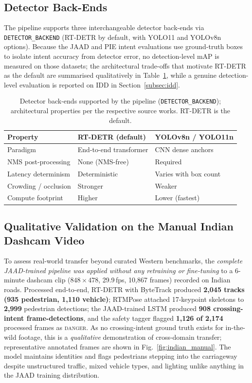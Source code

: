 \documentclass[conference]{IEEEtran}
\begin{document}
\subsection{Detector Back-Ends}

The pipeline supports three interchangeable detector back-ends via
\texttt{DETECTOR\_BACKEND} (RT-DETR by default, with YOLO11 and YOLOv8n options).
Because the JAAD and PIE intent evaluations use ground-truth boxes to isolate intent
accuracy from detector error, no detection-level mAP is measured on those datasets; the
architectural trade-offs that motivate RT-DETR as the default are summarised
qualitatively in Table~\ref{tab:detector_qual}, while a genuine detection-level
evaluation is reported on IDD in Section~\ref{subsec:idd}.

\begin{table}[h]
\centering
\small
\setlength{\tabcolsep}{4pt}
\renewcommand{\arraystretch}{1.15}
\caption{Detector back-ends supported by the pipeline
(\texttt{DETECTOR\_BACKEND}); architectural properties per the respective source
works. RT-DETR is the default.}
\label{tab:detector_qual}
\begin{tabular}{|p{2.0cm}|p{2.6cm}|p{2.2cm}|}
\hline
\textbf{Property} & \textbf{RT-DETR (default)} & \textbf{YOLOv8n / YOLO11n} \\
\hline
Paradigm & End-to-end transformer & CNN dense anchors \\ \hline
NMS post-processing & None (NMS-free) & Required \\ \hline
Latency determinism & Deterministic & Varies with box count \\ \hline
Crowding / occlusion & Stronger & Weaker \\ \hline
Compute footprint & Higher & Lower (fastest) \\ \hline
\end{tabular}
\end{table}

\subsection{Qualitative Validation on the Manual Indian Dashcam Video}
\label{subsec:manual}
To assess real-world transfer beyond curated Western benchmarks, the
\emph{complete JAAD-trained pipeline was applied without any retraining or
fine-tuning} to a 6-minute dashcam clip ($848\times478$, 29.9\,fps, 10{,}867
frames) recorded on Indian roads. Processed end-to-end, RT-DETR with ByteTrack
produced \textbf{2{,}045 tracks (935 pedestrian, 1{,}110 vehicle)}; RTMPose
attached 17-keypoint skeletons to \textbf{2{,}999} pedestrian detections; the
JAAD-trained LSTM produced \textbf{908 crossing-intent frame-detections}, and the
safety tagger flagged \textbf{1{,}126 of 2{,}174} processed frames as
\textsc{danger}. As no crossing-intent ground truth exists for in-the-wild
footage, this is a \emph{qualitative} demonstration of cross-domain transfer;
representative annotated frames are shown in Fig.~\ref{fig:indian_manual}. The
model maintains identities and flags pedestrians stepping into the carriageway
despite unstructured traffic, mixed vehicle types, and lighting unlike anything
in the JAAD training distribution.
\end{document}
